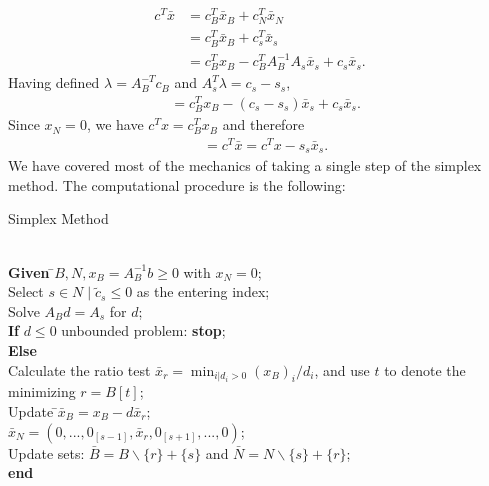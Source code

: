 \documentclass[a4paper,10 pt,titlepage,twoside]{book}
\theoremstyle{plain}
\theoremstyle{definition}
\theoremstyle{remark}
\begin{document}
\begin{align*}
c^{T}\bar{x} &=c^{T}_{B}\bar{x}_{B}+c^{T}_{N}\bar{x}_{N}\\
			 &=c_{B}^{T}\bar{x}_{B}+c^{T}_{s}\bar{x}_{s}\\
			 &=c_{B}^{T}x_{B}-c^{T}_{B}A_{B}^{-1}A_{s}\bar{x}_{s}+c_{s}\bar{x}_{s}.
\end{align*}
Having defined $ \lambda=A_{B}^{-T}c_{B}$ and $A^{T}_{s}\lambda = c_{s}-s_{s}$,
\begin{align*}
&= c^{T}_{B}x_{B}-(c_{s} -s_{s})\bar{x}_{s} +c_{s}\bar{x}_{s}.
\end{align*}
Since $x_{N}=0$, we have $c^{T}x=c^{T}_{B}x_{B}$ and therefore 
\begin{align*}
&=c^{T}\bar{x} = c^{T}x - s_{s}\bar{x}_{s}.
\end{align*}
We have covered most of the mechanics of taking a single step of the simplex method. The computational procedure is the following:
\\
\begin{algorithm}[H]\caption{\label{Alg:1}Simplex Method}
\begin{tabbing}
	\\
	\textbf{Given} \=$B, N, x_{B} = A_{B}^{-1}b\geq 0$ with $x_{N}=0$;\\
	\> Select $s\in N\;|\;\widetilde{c}_{s}\leq 0$ as the entering index;\\
	\> Solve $A_{B}d = A_{s}$ for $d$;\\
	\>\textbf{If} {$d \leq 0$} unbounded problem: \textbf{stop};\\
	\>\textbf{Else} \=\\
	\>\>Calculate the ratio test $\bar{x}_{r} = \min_{i | d_{i} > 0}(x_{B})_{i}/d_{i}$, and use $t$ to denote the minimizing $r = B[t]$;\\
	\>\>Update \=$\bar{x}_{B} = x_{B}-d\bar{x}_{r}$;\\
	\>\>\>$\bar{x}_{N} = (0,...,0_{[s-1]},\bar{x}_{r},0_{[s+1]},...,0)$;\\
	\>\> Update sets: $\bar{B} = B \backslash \{r\} + \{s\}$ and $\bar{N} = N \backslash \{s\} + \{r\}$;\\
	\textbf{end}
\end{tabbing}
\end{algorithm}
\end{document}
